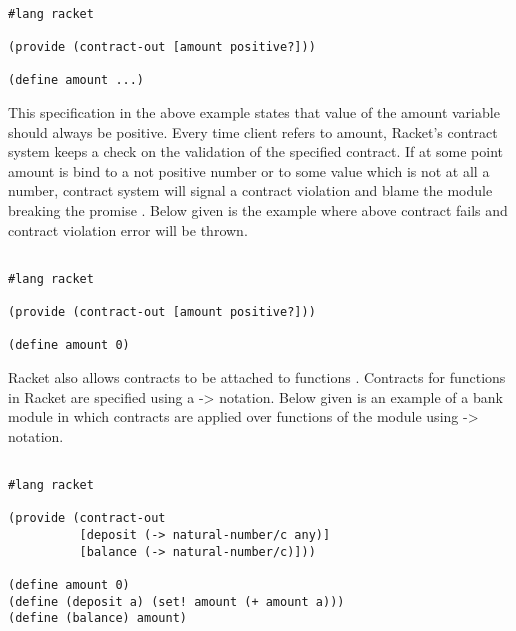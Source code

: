 \begin{minipage}{\linewidth}
\lstset{caption=Basic contract example in Racket, captionpos=b, breaklines=true}       
\begin{lstlisting}[frame=single]

#lang racket

(provide (contract-out [amount positive?]))
 
(define amount ...)

\end{lstlisting}
\end{minipage}

This specification in the above example states that value of the amount variable should always be positive. Every time client refers to amount, Racket's contract system keeps a check on the validation of the specified contract. If at some point amount is bind to a not positive number or to some value which is not at all a number, contract system will signal a contract violation and blame the module breaking the promise \cite{RacketContracts}. Below given is the example where above contract fails and contract violation error will be thrown.

\lstset{caption=Contract violation example in Racket, captionpos=b, breaklines=true}       
\begin{lstlisting}[frame=single]

#lang racket

(provide (contract-out [amount positive?]))
 
(define amount 0)

\end{lstlisting}

Racket also allows contracts to be attached to functions \cite{RacketContractsFunc}. Contracts for functions in Racket are specified using a -> notation. Below given is an example of a bank module in which contracts are applied over functions of the module using -> notation.

\begin{minipage}{\linewidth}
\lstset{caption=Contract over functions in Racket, captionpos=b, breaklines=true}       
\begin{lstlisting}[frame=single]

#lang racket

(provide (contract-out
          [deposit (-> natural-number/c any)]
          [balance (-> natural-number/c)]))

(define amount 0)
(define (deposit a) (set! amount (+ amount a)))
(define (balance) amount)

\end{lstlisting}
\end{minipage}

